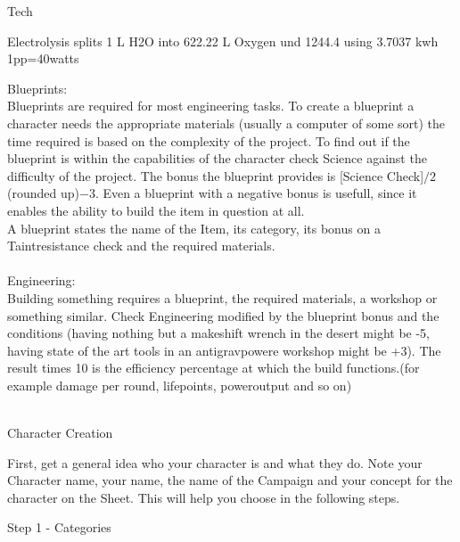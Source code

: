 \documentclass{article}
\newcommand{\headline}[1]{\begin{center}\Large #1 \normalsize \end{center}}
\newcommand{\subhline}[1]{\begin{center}\large #1 \normalsize \end{center}}
\begin{document}
\subhline{Tech}
Electrolysis splits 1 L H2O into 622.22 L Oxygen und 1244.4 using 3.7037 kwh\\
1pp=40watts

Blueprints:\\
Blueprints are required for most engineering tasks. To create a blueprint a character needs the appropriate materials
(usually a computer of some sort) the time required is based on the complexity of the project. To find out if the
blueprint is within the capabilities of the character check Science against the difficulty of the project. The bonus
the blueprint provides is [Science Check]\(/2\)(rounded up)\(-3\). Even a blueprint with a negative bonus is usefull,
since it enables the ability to build the item in question at all.\\
A blueprint states the name of the Item, its category, its bonus on a Taintresistance check and the required materials.\\\\

Engineering:\\
Building something requires a blueprint, the required materials, a workshop or something similar. Check Engineering
modified by the blueprint bonus and the conditions (having nothing but a makeshift wrench in the desert might be -5, having state of the art
tools in an antigravpowere workshop might be +3). The result times 10 is the efficiency percentage at which the build
functions.(for example damage per round, lifepoints, poweroutput and so on)\\\\


\headline{Character Creation}

First, get a general idea who your character is and what they do. Note your Character name, your name, the name of the
 Campaign and your concept for the character on the Sheet. This will help you choose in the following steps.

\subhline{Step 1 - Categories}
\end{document}

